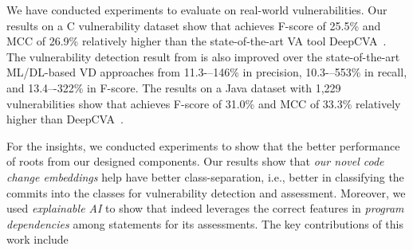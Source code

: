 

We have conducted experiments to evaluate {\tool} on real-world
vulnerabilities. Our results on a C vulnerability dataset
show that {\tool} achieves F-score of 25.5\% and MCC of 26.9\%
relatively higher than the state-of-the-art VA tool
DeepCVA~\cite{deepCVA-ase21}.  The vulnerability detection result from
{\tool} is also improved over the state-of-the-art ML/DL-based VD
approaches from 11.3-–146\% in precision, 10.3-–553\% in recall,
and 13.4–-322\% in F-score.
The results on a Java dataset with 1,229 vulnerabilities show that
{\tool} achieves F-score of 31.0\% and MCC of 33.3\% relatively higher
than DeepCVA~\cite{deepCVA-ase21}.


For the insights, we conducted experiments to show that the better
performance of {\tool} roots from our designed components.
Our results show that {\em our novel code change embeddings} help
{\tool} have better class-separation, i.e., better in classifying the
commits into the classes for vulnerability detection and
assessment. Moreover, we used {\em explainable AI} to show
that {\tool} indeed leverages the correct features in {\em program
  dependencies} among statements for its assessments.
The key contributions of this work include

